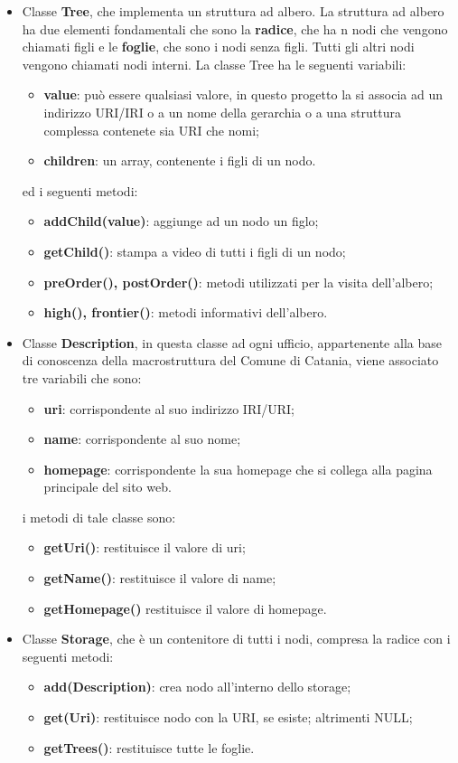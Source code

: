 \documentclass[a4paper,11pt]{article}
\begin{document}
\begin{itemize}
	\item Classe \textbf{Tree}, che implementa un struttura ad albero. La struttura ad albero ha due elementi fondamentali che sono la \textbf{radice}, che ha n nodi che vengono chiamati figli e le \textbf{foglie}, che sono i nodi senza figli. Tutti gli altri nodi vengono chiamati nodi interni.
La classe Tree	ha le seguenti variabili:
\begin{itemize}
	\item \textbf{value}: può essere qualsiasi valore, in questo progetto la si associa ad un indirizzo URI/IRI o a un nome della gerarchia o a una struttura complessa contenete sia URI che nomi;
	\item \textbf{children}: un array, contenente i figli di un nodo.
\end{itemize}
ed i seguenti metodi:
\begin{itemize}
	\item \textbf{addChild(value)}: aggiunge ad un nodo un figlo;
	\item \textbf{getChild()}: stampa a video di tutti i figli di un nodo;
	\item \textbf{preOrder(), postOrder()}: metodi utilizzati per la visita dell'albero;
	\item \textbf{high(), frontier()}: metodi informativi dell'albero.
\end{itemize}			
	\item Classe \textbf{Description}, in questa classe ad ogni ufficio, appartenente alla base di conoscenza della macrostruttura del Comune di Catania, viene associato tre variabili che sono:
\begin{itemize}
	\item \textbf{uri}: corrispondente al suo indirizzo IRI/URI;
	\item \textbf{name}: corrispondente al suo nome;
	\item \textbf{homepage}: corrispondente la sua homepage che si collega alla pagina principale del sito web.
\end{itemize}	
i metodi di tale classe sono:
\begin{itemize}
	\item \textbf{getUri()}: restituisce il valore di uri;
	\item \textbf{getName()}: restituisce il valore di name;
	\item \textbf{getHomepage()} restituisce il valore di homepage.
\end{itemize} 
\item Classe \textbf{Storage}, che è un contenitore di tutti i nodi, compresa la radice con i seguenti metodi:
\begin{itemize}
	\item \textbf{add(Description)}: crea nodo all'interno dello storage;
	\item \textbf{get(Uri)}: restituisce nodo con la URI, se esiste; altrimenti NULL;
	\item \textbf{getTrees()}: restituisce tutte le foglie.
\end{itemize}
\end{itemize}	
\end{document}
